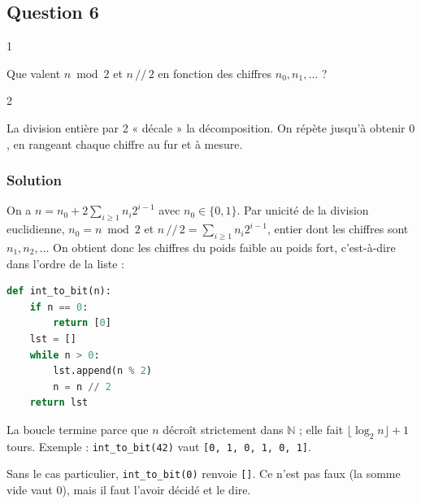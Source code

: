 \documentclass[11pt,a4paper]{article}
\begin{document}
\hypertarget{question-6}{%
\subsection{Question 6}\label{question-6}}

\begin{indication}{1}

Que valent \(n \bmod 2\) et \(n \,//\, 2\) en fonction des chiffres \(n_0, n_1, \dots\) ?

\end{indication}

\begin{indication}{2}

La division entière par 2 « décale » la décomposition. On répète jusqu'à obtenir \(0\), en rangeant chaque chiffre au fur et à mesure.

\end{indication}

\hypertarget{solution-5}{%
\subsubsection{Solution}\label{solution-5}}

On a \(n = n_0 + 2\sum_{i\ge1} n_i 2^{i-1}\) avec \(n_0 \in \{0,1\}\). Par unicité de la division euclidienne, \(n_0 = n \bmod 2\) et \(n \,//\, 2 = \sum_{i \ge 1} n_i 2^{i-1}\), entier dont les chiffres sont \(n_1, n_2, \dots\) On obtient donc les chiffres du poids faible au poids fort, c'est-à-dire dans l'ordre de la liste :

\begin{lstlisting}[language=Python]
def int_to_bit(n):
    if n == 0:
        return [0]
    lst = []
    while n > 0:
        lst.append(n % 2)
        n = n // 2
    return lst
\end{lstlisting}

La boucle termine parce que \(n\) décroît strictement dans \(\mathbb{N}\) ; elle fait \(\lfloor \log_2 n \rfloor + 1\) tours. Exemple : \texttt{int\_to\_bit(42)} vaut \texttt{{[}0,\allowbreak{}\ 1,\allowbreak{}\ 0,\allowbreak{}\ 1,\allowbreak{}\ 0,\allowbreak{}\ 1{]}\allowbreak{}}.

\begin{piege}

Sans le cas particulier, \texttt{int\_to\_bit(0)} renvoie \texttt{{[}{]}}. Ce n'est pas faux (la somme vide vaut 0), mais il faut l'avoir décidé et le dire.

\end{piege}
\end{document}
